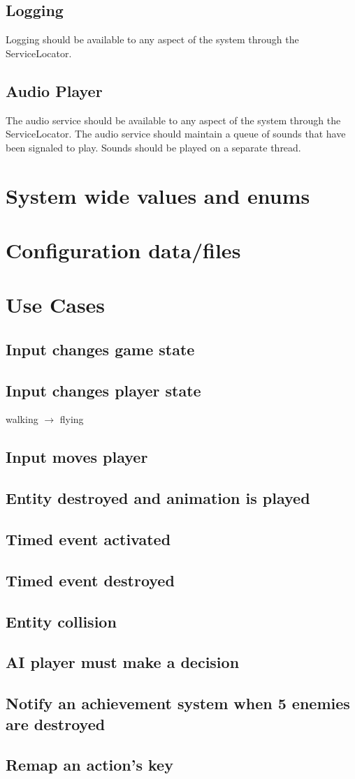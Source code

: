 \documentclass[12pt]{article}
\begin{document}
\subsection{ Logging }
Logging should be available to any aspect of the system through the ServiceLocator.  
\subsection{ Audio Player} 
The audio service should be available to any aspect of the system through the ServiceLocator.  The audio service should maintain a queue of sounds that have been signaled to play.  Sounds should be played on a separate thread.  

\section{	System wide values and enums}

\section{	Configuration data/files}

\section{Use Cases}
\subsection{Input changes game state}
\subsection{Input changes player state}
walking $\rightarrow$ flying
\subsection{Input moves player}
\subsection{Entity destroyed and animation is played}
\subsection{Timed event activated}
\subsection{Timed event destroyed}
\subsection{Entity collision}
\subsection{AI player must make a decision}
\subsection{Notify an achievement system when 5 enemies are destroyed}
\subsection{Remap an action's key}
\end{document}
